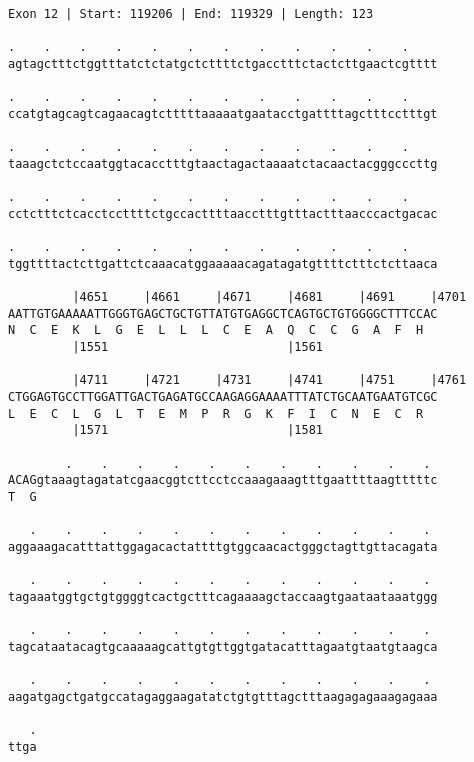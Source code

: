 \documentclass{article}
\begin{document}
\newpage
\begin{Verbatim}
Exon 12 | Start: 119206 | End: 119329 | Length: 123
 
.    .    .    .    .    .    .    .    .    .    .    .    
agtagctttctggtttatctctatgctcttttctgacctttctactcttgaactcgtttt
  
.    .    .    .    .    .    .    .    .    .    .    .    
ccatgtagcagtcagaacagtctttttaaaaatgaatacctgattttagctttcctttgt
  
.    .    .    .    .    .    .    .    .    .    .    .    
taaagctctccaatggtacacctttgtaactagactaaaatctacaactacgggcccttg
  
.    .    .    .    .    .    .    .    .    .    .    .    
cctctttctcacctccttttctgccacttttaacctttgtttactttaacccactgacac
  
.    .    .    .    .    .    .    .    .    .    .    .    
tggttttactcttgattctcaaacatggaaaaacagatagatgttttctttctcttaaca
  
         |4651     |4661     |4671     |4681     |4691     |4701
AATTGTGAAAAATTGGGTGAGCTGCTGTTATGTGAGGCTCAGTGCTGTGGGGCTTTCCAC
N  C  E  K  L  G  E  L  L  L  C  E  A  Q  C  C  G  A  F  H  
         |1551                         |1561                
  
         |4711     |4721     |4731     |4741     |4751     |4761
CTGGAGTGCCTTGGATTGACTGAGATGCCAAGAGGAAAATTTATCTGCAATGAATGTCGC
L  E  C  L  G  L  T  E  M  P  R  G  K  F  I  C  N  E  C  R  
         |1571                         |1581                
  
        .    .    .    .    .    .    .    .    .    .    . 
ACAGgtaaagtagatatcgaacggtcttcctccaaagaaagtttgaattttaagtttttc
T  G                                                        
  
   .    .    .    .    .    .    .    .    .    .    .    . 
aggaaagacatttattggagacactattttgtggcaacactgggctagttgttacagata
  
   .    .    .    .    .    .    .    .    .    .    .    . 
tagaaatggtgctgtggggtcactgctttcagaaaagctaccaagtgaataataaatggg
  
   .    .    .    .    .    .    .    .    .    .    .    . 
tagcataatacagtgcaaaaagcattgtgttggtgatacatttagaatgtaatgtaagca
  
   .    .    .    .    .    .    .    .    .    .    .    . 
aagatgagctgatgccatagaggaagatatctgtgtttagctttaagagagaaagagaaa
  
   .
ttga
\end{Verbatim}
\newpage
\end{document}
